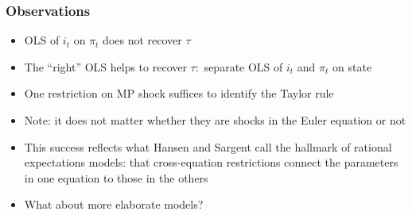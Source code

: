 \documentclass[handout]{beamer}
\begin{document}
\begin{frame}
\frametitle{Observations}

\begin{itemize} \itemsep=\bigskipamount
    \item OLS of $i_t$ on $\pi_t$ does not recover $\tau$
    \item The ``right'' OLS helps to recover $\tau:$ separate OLS of $i_t$ and $\pi_t$ on state
     \item  One restriction on MP shock suffices to identify the Taylor rule
     \item Note: it does not matter whether they are shocks in the Euler equation or not
     \item This success reflects what Hansen and Sargent call the hallmark of rational expectations models: that cross-equation restrictions connect the parameters in one equation to those in the others
     \item What about more elaborate models?
\end{itemize}

\end{frame}
\end{document}
